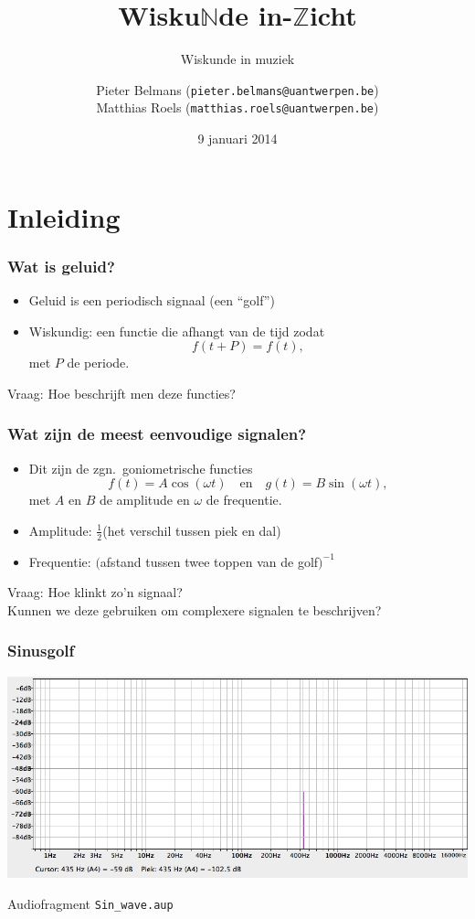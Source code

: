 \documentclass[compress, darktitle, framenumber]{beamer}
\title{Wisku$\mathbb{N}$de in-$\mathbb{Z}$icht}
\subtitle{Wiskunde in muziek}
\author{Pieter Belmans (\texttt{pieter.belmans@uantwerpen.be}) \\ Matthias Roels (\texttt{matthias.roels@uantwerpen.be})}
\date{9 januari 2014}
\begin{document}
\begin{frame}
  \titlepage
\end{frame}

\section{Inleiding}

\begin{frame}
\frametitle{Wat is geluid?}
\begin{itemize}
\item Geluid is een periodisch signaal (een ``golf'') 
\item Wiskundig: een functie die afhangt van de tijd zodat $$f(t+P)=f(t),$$ met $P$ de periode.
\end{itemize}
\begin{alertblock}{Vraag:}
Hoe beschrijft men deze functies? 
\end{alertblock}
\end{frame}

\begin{frame}
\frametitle{Wat zijn de meest eenvoudige signalen?}
\begin{itemize}
\item Dit zijn de zgn.\ goniometrische functies $$f(t)=A\cos (\omega t) \quad \text{en} \quad g(t)=B\sin (\omega t),$$ met $A$ en $B$ de amplitude en $\omega$ de frequentie. 
\item Amplitude: $\frac{1}{2}$(het verschil tussen piek en dal)
\item Frequentie: $($afstand tussen twee toppen van de golf$)^{-1}$
\end{itemize}
\begin{alertblock}{Vraag:}
Hoe klinkt zo'n signaal? \\
Kunnen we deze gebruiken om complexere signalen te beschrijven?  
\end{alertblock}
\end{frame}

\begin{frame}
\frametitle{Sinusgolf}
\includegraphics[width=\textwidth]{images/Sin_wave.png}
\begin{block}{Audiofragment}
\texttt{Sin\_wave.aup}
\end{block}
\end{frame}
\end{document}
